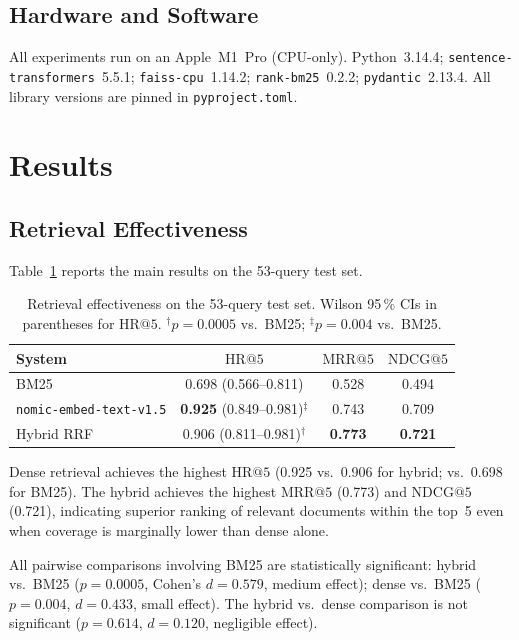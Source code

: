 \documentclass[conference]{IEEEtran}
\makeatletter
\newcommand{\nomic}{\texttt{nomic-embed-text-v1.5}\xspace}
\newcommand{\HR}[1]{\mathrm{HR}@{#1}}
\newcommand{\MRR}[1]{\mathrm{MRR}@{#1}}
\newcommand{\NDCG}[1]{\mathrm{NDCG}@{#1}}
\makeatother
\begin{document}
\subsection{Hardware and Software}

All experiments run on an Apple~M1~Pro (CPU-only).
Python~3.14.4; \texttt{sentence-transformers}~5.5.1;
\texttt{faiss-cpu}~1.14.2; \texttt{rank-bm25}~0.2.2;
\texttt{pydantic}~2.13.4.
All library versions are pinned in \texttt{pyproject.toml}.

\section{Results}

\subsection{Retrieval Effectiveness}

Table~\ref{tab:effectiveness} reports the main results on the
53-query test set.

\begin{table}[!t]
\renewcommand{\arraystretch}{1.3}
\caption{Retrieval effectiveness on the 53-query test set.
  Wilson 95\,\% CIs in parentheses for $\HR{5}$.
  $^\dagger p{=}0.0005$ vs.\ BM25;
  $^\ddagger p{=}0.004$ vs.\ BM25.}
\label{tab:effectiveness}
\centering
\small
\begin{tabular}{@{}lccc@{}}
\toprule
System & $\HR{5}$ & $\MRR{5}$ & $\NDCG{5}$ \\
\midrule
BM25
  & 0.698 (0.566--0.811)
  & 0.528
  & 0.494 \\
\nomic
  & \textbf{0.925} (0.849--0.981)$^\ddagger$
  & 0.743
  & 0.709 \\
Hybrid RRF
  & 0.906 (0.811--0.981)$^\dagger$
  & \textbf{0.773}
  & \textbf{0.721} \\
\bottomrule
\end{tabular}
\end{table}

Dense retrieval achieves the highest $\HR{5}$ (0.925 vs.\ 0.906 for
hybrid; vs.\ 0.698 for BM25).
The hybrid achieves the highest $\MRR{5}$ (0.773) and $\NDCG{5}$
(0.721), indicating superior ranking of relevant documents within the
top~5 even when coverage is marginally lower than dense alone.

All pairwise comparisons involving BM25 are statistically significant:
hybrid vs.\ BM25 ($p{=}0.0005$, Cohen's $d{=}0.579$, medium effect);
dense vs.\ BM25 ($p{=}0.004$, $d{=}0.433$, small effect).
The hybrid vs.\ dense comparison is not significant
($p{=}0.614$, $d{=}0.120$, negligible effect).
\end{document}
